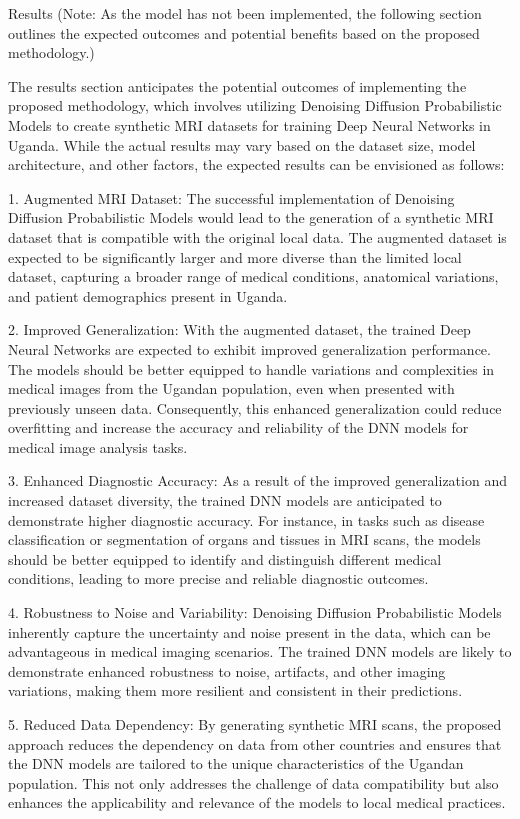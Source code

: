 Results (Note: As the model has not been implemented, the following section outlines the expected outcomes and potential benefits based on the proposed methodology.)

The results section anticipates the potential outcomes of implementing the proposed methodology, which involves utilizing Denoising Diffusion Probabilistic Models to create synthetic MRI datasets for training Deep Neural Networks in Uganda. While the actual results may vary based on the dataset size, model architecture, and other factors, the expected results can be envisioned as follows:

1. Augmented MRI Dataset:
The successful implementation of Denoising Diffusion Probabilistic Models would lead to the generation of a synthetic MRI dataset that is compatible with the original local data. The augmented dataset is expected to be significantly larger and more diverse than the limited local dataset, capturing a broader range of medical conditions, anatomical variations, and patient demographics present in Uganda.

2. Improved Generalization:
With the augmented dataset, the trained Deep Neural Networks are expected to exhibit improved generalization performance. The models should be better equipped to handle variations and complexities in medical images from the Ugandan population, even when presented with previously unseen data. Consequently, this enhanced generalization could reduce overfitting and increase the accuracy and reliability of the DNN models for medical image analysis tasks.

3. Enhanced Diagnostic Accuracy:
As a result of the improved generalization and increased dataset diversity, the trained DNN models are anticipated to demonstrate higher diagnostic accuracy. For instance, in tasks such as disease classification or segmentation of organs and tissues in MRI scans, the models should be better equipped to identify and distinguish different medical conditions, leading to more precise and reliable diagnostic outcomes.

4. Robustness to Noise and Variability:
Denoising Diffusion Probabilistic Models inherently capture the uncertainty and noise present in the data, which can be advantageous in medical imaging scenarios. The trained DNN models are likely to demonstrate enhanced robustness to noise, artifacts, and other imaging variations, making them more resilient and consistent in their predictions.

5. Reduced Data Dependency:
By generating synthetic MRI scans, the proposed approach reduces the dependency on data from other countries and ensures that the DNN models are tailored to the unique characteristics of the Ugandan population. This not only addresses the challenge of data compatibility but also enhances the applicability and relevance of the models to local medical practices.

